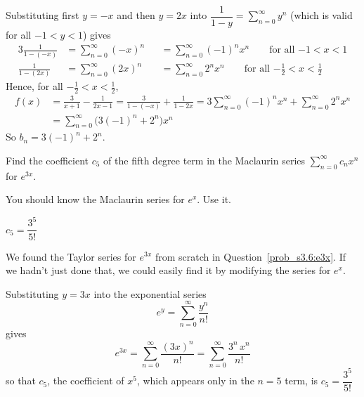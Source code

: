 \begin{solution}
Substituting first $y=-x$ and then $y=2x$ into
$\dfrac{1}{1-y} = \displaystyle\sum\limits_{n=0}^\infty y^n$ 
(which is valid for all $-1<y<1$) gives
\begin{alignat*}{3}
\frac{1}{1-(-x)} &= \sum_{n=0}^\infty (-x)^n&&=\sum_{n=0}^\infty (-1)^nx^n
\qquad\text{for all $-1<x<1$} \\
\frac{1}{1-(2x)} &= \sum_{n=0}^\infty (2x)^n&&=\sum_{n=0}^\infty 2^nx^n
\qquad\text{for all $-\tfrac{1}{2}<x<\tfrac{1}{2}$}
\end{alignat*}
Hence, for all $-\tfrac{1}{2}<x<\tfrac{1}{2}$,
\begin{align*}
f(x) &=\frac{3}{x+1} - \frac{1}{2x-1} = \frac{3}{1-(-x)} + \frac{1}{1-2x}
=3\sum_{n=0}^\infty (-1)^nx^n  +  \sum_{n=0}^\infty 2^nx^n \\
&=\sum_{n=0}^\infty \big(3(-1)^n + 2^n\big)x^n
\end{align*}
So $b_n = 3(-1)^n + 2^n$.


\end{solution}
\begin{question}[2014A]
Find the coefficient $c_5$ of the fifth degree term in the Maclaurin
series $\displaystyle\sum_{n=0}^\infty c_nx^n$ for $e^{3x}$.
\end{question}

\begin{hint}
You should know the Maclaurin series for $e^x$. Use it.
\end{hint}

\begin{answer}
$c_5=\dfrac{3^5}{5!}$
\end{answer}

\begin{solution}
We found the Taylor series for $e^{3x}$ from scratch in Question~\ref{prob_s3.6:e3x}. If we hadn't just done that, we could easily find it by modifying the series for $e^x$.

Substituting $y=3x$ into the exponential series
\begin{equation*}
e^y=\sum_{n=0}^\infty\frac{y^n}{n!}
\end{equation*}
gives
\begin{equation*}
e^{3x}=\sum_{n=0}^\infty\frac{(3x)^n}{n!}
=\sum_{n=0}^\infty\frac{3^n\,x^n}{n!}
\end{equation*}
so that $c_5$, the coefficient of $x^5$, which appears only in
the $n=5$ term, is
$c_5=\dfrac{3^5}{5!}$
\end{solution}

